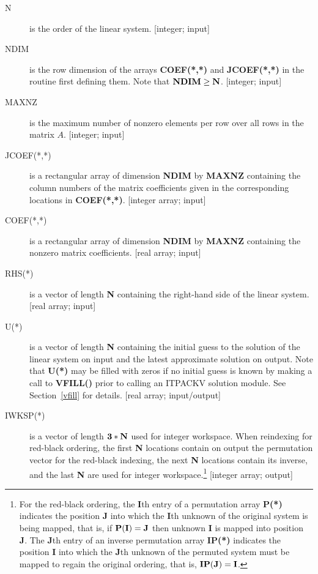 \bigskip
\begin{description}
 \item[N] is the order of the linear system.  [integer; input] 
 
 \item[NDIM] is the row dimension of the arrays {\bf COEF(*,*)} and 
             {\bf JCOEF(*,*)} in the routine first defining them.  
             Note that ${\bf NDIM} \geq {\bf N}$.  [integer; input]
 
 \item[MAXNZ] is the maximum number of nonzero elements per row over 
              all rows in the matrix $A$.  [integer; input]
 
 \item[JCOEF(*,*)] is a rectangular array of dimension {\bf NDIM} by 
                   {\bf MAXNZ} containing the column numbers of the 
                   matrix coefficients given in the corresponding
                   locations in {\bf COEF(*,*)}.  [integer array; input]

 \item[COEF(*,*)] is a rectangular array of dimension {\bf NDIM} by 
                  {\bf MAXNZ} containing the nonzero matrix coefficients.
                  [real array; input]
 
 \item[RHS(*)] is a vector of length {\bf N} containing the right-hand side 
               of the linear system.  [real array; input] 

 \item[U(*)] is a vector of length {\bf N} containing the initial guess 
             to the solution of the linear system on input and the 
             latest approximate solution on output.  Note that {\bf U(*)} 
             may be filled with zeros if no initial guess is known by 
             making a call to {\bf VFILL()} prior to calling an ITPACKV 
             solution module.  See Section~\ref{vfill} for details.
             [real array; input/output] 
 
 \item[IWKSP(*)] is a vector of length ${\bf 3*N}$ used for integer workspace. 
                 When reindexing for red-black ordering, the first 
                 {\bf N} locations contain on output the permutation 
                 vector for the red-black indexing, the next {\bf N} 
                 locations contain its inverse, and the last {\bf N} 
                 are used for integer workspace.\footnote{For the 
                 red-black ordering, the {\bf I}th entry of a permutation 
                 array {\bf P(*)} indicates the position {\bf J} into 
                 which the {\bf I}th unknown of the original system is 
                 being mapped, that is, if ${\bf P(I)=J}$ then unknown 
                 {\bf I} is mapped into position {\bf J}.  The {\bf J}th 
                 entry of an inverse permutation array {\bf IP(*)} 
                 indicates the position {\bf I} into which the {\bf J}th 
                 unknown of the permuted system must be mapped to regain 
                 the original ordering, that is, ${\bf IP(J)=I}$.} 
                 [integer array; output] 


\end{description}
